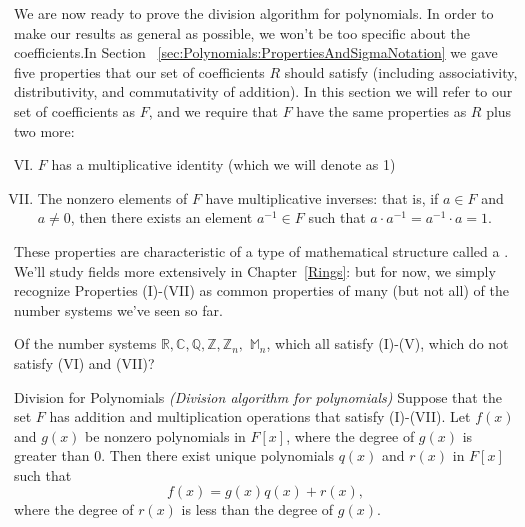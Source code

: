 We are now ready to prove the division algorithm for polynomials. In order to make our results as general as possible, we won't be too specific about the coefficients.In Section ~\ref{sec:Polynomials:PropertiesAndSigmaNotation} we gave five properties that our set of coefficients $R$ should satisfy (including associativity, distributivity, and commutativity of addition). In this section we will refer to our set of coefficients as $F$, and we require that $F$ have the same properties as $R$ plus two more:

\begin{enumerate}[(I)]
\setcounter{enumi}{5}
    \item
    $F$ has a multiplicative identity (which we will denote as 1)
    \item
    The nonzero elements of $F$ have multiplicative inverses: that is, if $a \in F$ and $a \neq 0$, then there exists an element $a^{-1} \in F$ such that $a \cdot a^{-1} = a^{-1} \cdot a = 1$.
\end{enumerate}

These properties are characteristic of a type of mathematical structure called a . We'll study fields more extensively in Chapter~\ref{Rings}: but for now, we simply recognize Properties (I)-(VII) as common properties of many (but not all) of the number systems we've seen so far.

\begin{exercise}{}
Of the number systems ${\mathbb R},{\mathbb C},{\mathbb Q},{\mathbb Z},{\mathbb Z}_n,$  ${\mathbb M}_n$, which all satisfy (I)-(V), which do not satisfy (VI) and (VII)?
\end{exercise}

\begin{prop} {Division for Polynomials} \emph{(Division algorithm for polynomials)}
Suppose that the set $F$ has  addition and multiplication operations that satisfy (I)-(VII).  Let $f(x)$ and $g(x)$ be nonzero polynomials in $F[x]$, where the degree of $g(x)$ is greater than 0.  Then there exist unique polynomials $q(x)$ and $r(x)$ in $F[x]$ such that 
\[
f(x) = g(x)q(x) + r(x),
\]
where the degree of $r(x)$ is less than the degree of $g(x)$.
\end {prop}

